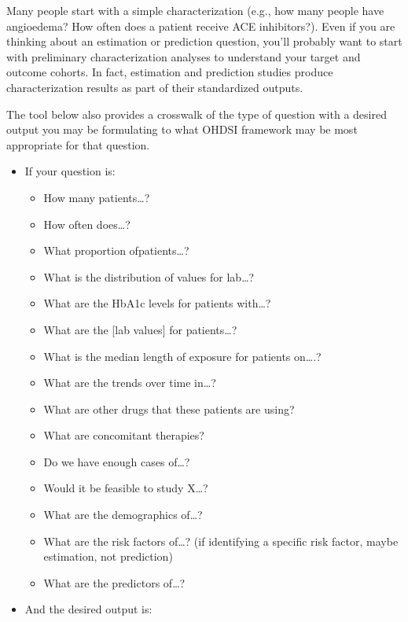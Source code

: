 \documentclass[11pt]{book}
\providecommand{\tightlist}{%
  \setlength{\itemsep}{0pt}\setlength{\parskip}{0pt}}
\theoremstyle{definition}
\theoremstyle{definition}
\theoremstyle{definition}
\theoremstyle{remark}
\begin{document}
Many people start with a simple characterization (e.g., how many people have angioedema? How often does a patient receive ACE inhibitors?). Even if you are thinking about an estimation or prediction question, you'll probably want to start with preliminary characterization analyses to understand your target and outcome cohorts. In fact, estimation and prediction studies produce characterization results as part of their standardized outputs.

The tool below also provides a crosswalk of the type of question with a desired output you may be formulating to what OHDSI framework may be most appropriate for that question.

\begin{itemize}
\tightlist
\item
  If your question is:

  \begin{itemize}
  \tightlist
  \item
    How many patients\ldots?
  \item
    How often does\ldots?
  \item
    What proportion ofpatients\ldots?
  \item
    What is the distribution of values for lab\ldots?
  \item
    What are the HbA1c levels for patients with\ldots?
  \item
    What are the {[}lab values{]} for patients\ldots?
  \item
    What is the median length of exposure for patients on\ldots.?
  \item
    What are the trends over time in\ldots?
  \item
    What are other drugs that these patients are using?
  \item
    What are concomitant therapies?
  \item
    Do we have enough cases of\ldots?
  \item
    Would it be feasible to study X\ldots?
  \item
    What are the demographics of\ldots?
  \item
    What are the risk factors of\ldots? (if identifying a specific risk factor, maybe estimation, not prediction)
  \item
    What are the predictors of\ldots?
  \end{itemize}
\item
  And the desired output is:


\end{itemize}
\end{document}
